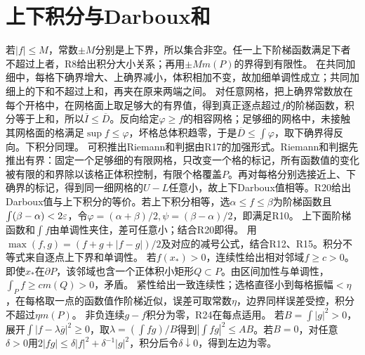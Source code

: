 \documentclass[UTF8,fontset=fandol,11pt]{ctexart}
\begin{document}
\section{上下积分与Darboux和}
若$|f|\le M$，常数$\pm M$分别是上下界，所以集合非空。任一上下阶梯函数满足下者不超过上者，R8给出积分大小关系；再用$\pm Mm(P)$的界得到有限性。
在共同加细中，每格下确界增大、上确界减小，体积相加不变，故加细单调性成立；共同加细上的下和不超过上和，再夹在原来两端之间。
对任意网格，把上确界常数放在每个开格中，在网格面上取足够大的有界值，得到真正逐点超过$f$的阶梯函数，积分等于上和，所以$\overline I\le\overline D$。反向给定$\varphi\ge f$的相容网格；足够细的网格中，未接触其网格面的格满足$\sup f\le\varphi$，坏格总体积趋零，于是$\overline D\le\int\varphi$，取下确界得反向。下积分同理。
可积推出Riemann和判据由R17的加强形式。Riemann和判据先推出有界：固定一个足够细的有限网格，只改变一个格的标记，所有函数值的变化被有限的和界除以该格正体积控制，有限个格覆盖$P$。再对每格分别选接近上、下确界的标记，得到同一细网格的$U-L$任意小，故上下Darboux值相等。R20给出Darboux值与上下积分的等价。若上下积分相等，选$\alpha\le f\le\beta$为阶梯函数且$\int(\beta-\alpha)<2\varepsilon$，令$\varphi=(\alpha+\beta)/2,\psi=(\beta-\alpha)/2$，即满足R10。
上下面阶梯函数和$\int f$由单调性夹住，差可任意小；结合R20即得。
用$\max(f,g)=(f+g+|f-g|)/2$及对应的减号公式，结合R12、R15。积分不等式来自逐点上下界和单调性。
若$f(x_*)>0$，连续性给出相对邻域$f\ge c>0$。即使$x_*$在$\partial P$，该邻域也含一个正体积小矩形$Q\subset P$。由区间加性与单调性，$\int_Pf\ge cm(Q)>0$，矛盾。
紧性给出一致连续性；选格直径小到每格振幅$<\eta$，在每格取一点的函数值作阶梯近似，误差可取常数$\eta$，边界同样误差受控，积分不超过$\eta m(P)$。
非负连续$g-f$积分为零，R24在每点适用。
若$B=\int|g|^2>0$，展开$\int|f-\lambda\overline g|^2\ge0$，取$\lambda=(\int fg)/B$得到$|\int fg|^2\le AB$。若$B=0$，对任意$\delta>0$用$2|fg|\le\delta|f|^2+\delta^{-1}|g|^2$，积分后令$\delta\downarrow0$，得到左边为零。
\originalpages
\end{document}
